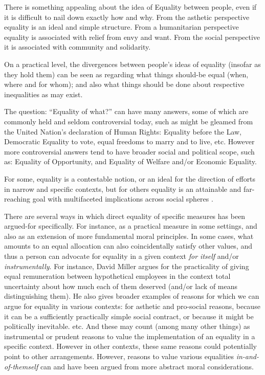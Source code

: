There is something appealing about the idea of Equality between people, even if it is difficult to nail down exactly how and why.
From the asthetic perspective equality is an ideal and simple structure. From a humanitarian perspective equality is associated with relief from envy and want. From the social perspective it is associated with community and solidarity.%


On a practical level, the divergences between people's ideas of equality (insofar as they hold them) can be seen as regarding what things should-be equal (when, where and for whom); and also what things should be done about respective inequalities as may exist.

The question: ``Equality of what?'' can have many answers, some of which are commonly held and seldom controversial today, such as might be gleamed from the United Nation's declaration of Human Rights: Equality before the Law, Democratic Equality to vote, equal freedoms to marry and to live, etc.\cite{udhr}
However more controversial answers tend to have broader social and political scope, such as: Equality of Opportunity, and Equality of Welfare and/or Economic Equality.%

For some, equality is a contestable notion, or an ideal for the direction of efforts in narrow and specific contexts, but for others equality is an attainable and far-reaching goal with multifaceted implications across social spheres \cite{walzer2008spheres,millerandwalzer,baker1992arguing}.

There are several ways in which direct equality of specific measures has been argued-for specifically.
For instance, as a practical measure in some settings, and also as an extension of more fundamental moral principles.
In some cases, what amounts to an equal allocation can also coincidentally satisfy other values, and thus a person can advocate for equality in a given context \textit{for itself} and/or \textit{instrumentally}.
For instance, David Miller \cite{equalityandjustice:1998} argues for the practicality of giving equal remuneration between hypothetical employees in the context total uncertainty about how much each of them deserved (and/or lack of means distinguishing them). He also gives broader examples of reasons for which we can argue for equality in various contexts: for asthetic and pro-social reasons, because it can be a sufficiently practically simple social contract, or because it might be politically inevitable. etc.
And these may count (among many other things) as instrumental or prudent reasons to value the implementation of an equality in a specific context. However in other contexts, these same reasons could potentially point to other arrangements.
However, reasons to value various equalities \textit{in-and-of-themself} can and have been argued from more abstract moral considerations.

